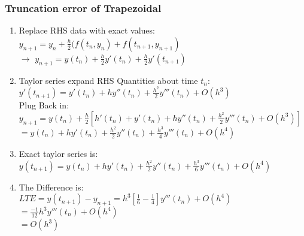 \documentclass[12pt]{article}
\begin{document}
	\subsubsection*{Truncation error of Trapezoidal}
	\begin{enumerate}
		\item Replace RHS data with exact values:\\
		 $y_{n+1} = y_n + \frac{h}{2}(f(t_n,y_n) + f(t_{n+1}, y_{n+1})$\\
		 $\rightarrow$ $y_{n+1} = y(t_n) + \frac{h}{2}y'(t_n) + \frac{h}{2}y'(t_{n+1})$
		\item Taylor series expand RHS Quantities about time $t_n$:\\
		$y'(t_{n+1}) = y'(t_n) + hy''(t_n) + \frac{h^2}{2}y'''(t_n) + O(h^3)$\\
		Plug Back in:\\
		$y_{n+1} = y(t_n) + \frac{h}{2}[h'(t_n) + y'(t_n) + hy''(t_n) + \frac{h^2}{2}y'''(t_n) + O(h^3)]$\\
		$= y(t_n) + hy'(t_n) + \frac{h^2}{2}y''(t_n) + \frac{h^3}{4}y'''(t_n) + O(h^4)$
		\item Exact taylor series is:\\
		$y(t_{n+1}) = y(t_n) + hy'(t_n) + \frac{h^2}{2}y''(t_n) + \frac{h^3}{6}y'''(t_n) + O(h^4)$
		\item The Difference is:\\
		$LTE = y(t_{n+1}) - y_{n+1} = h^3[\frac{1}{6} - \frac{1}{4}]y'''(t_n) + O(h^4)$\\
		$= \frac{-1}{12}h^3y'''(t_n) + O(h^4)$\\
		$= O(h^3)$
	\end{enumerate}
	
\end{document}

